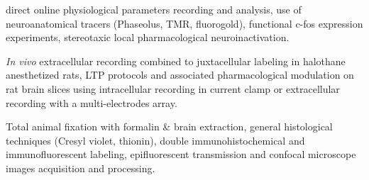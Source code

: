  direct online physiological parameters recording and analysis, use of neuroanatomical tracers (Phaseolus, TMR, fluorogold), functional c-fos expression experiments, stereotaxic local pharmacological neuroinactivation.

 \textit{In vivo} extracellular recording combined to juxtacellular labeling in halothane anesthetized rats, LTP protocols and associated pharmacological modulation on rat brain slices using intracellular recording in current clamp or extracellular recording with a multi-electrodes array.

 Total animal fixation with formalin \& brain extraction, general histological techniques (Cresyl violet, thionin), double immunohistochemical and immunofluorescent labeling, epifluorescent transmission and confocal microscope images acquisition and processing.
